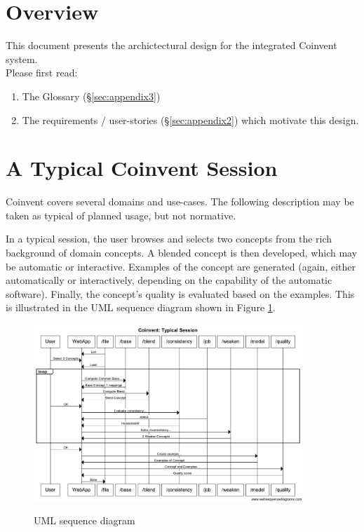 \documentclass[a4paper,twoside,11pt]{article}
\begin{document}


\section{Overview}\label{sec:overview}

This document presents the archictectural design for the integrated Coinvent system. \mbox{}\\
Please first read:
\begin{enumerate}
\item{The Glossary (\S\ref{sec:appendix3})}
\item{The requirements / user-stories (\S\ref{sec:appendix2}) which motivate this design.}
\end{enumerate}

\section{A Typical Coinvent Session}\label{sec:typical}

Coinvent covers several domains and use-cases. The following description may be taken
as typical of planned usage, but not normative.

In a typical session, the user browses and selects two concepts from the 
rich background of domain concepts. A blended concept is then developed, which
may be automatic or interactive. Examples of the concept are generated (again, either
automatically or interactively, depending on the capability of the automatic software). Finally, the concept's quality is evaluated based on the examples.
This is illustrated in the UML sequence diagram shown in Figure \ref{fig:sequence-diagram}.
\begin{figure}[!ht]
\includegraphics[width=0.9\textwidth]{sequence-diagram.png}
\label{fig:sequence-diagram}
\caption{UML sequence diagram}
\end{figure}
\end{document}
